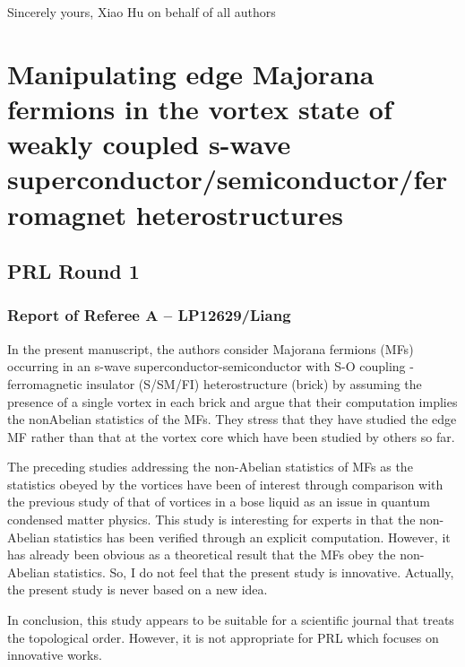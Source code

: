 \documentclass[11pt]{article}
\begin{document}
Sincerely yours, Xiao Hu on behalf of all authors

    \hypertarget{manipulating-edge-majorana-fermions-in-the-vortex-state-of-weakly-coupled-s-wave-superconductorsemiconductorferromagnet-heterostructures}{%
\section{Manipulating edge Majorana fermions in the vortex state of
weakly coupled s-wave superconductor/semiconductor/ferromagnet
heterostructures}\label{manipulating-edge-majorana-fermions-in-the-vortex-state-of-weakly-coupled-s-wave-superconductorsemiconductorferromagnet-heterostructures}}

\hypertarget{prl-round-1}{%
\subsection{PRL Round 1}\label{prl-round-1}}

\hypertarget{report-of-referee-a-lp12629liang}{%
\subsubsection{Report of Referee A --
LP12629/Liang}\label{report-of-referee-a-lp12629liang}}

In the present manuscript, the authors consider Majorana fermions (MFs)
occurring in an s-wave superconductor-semiconductor with S-O coupling
-ferromagnetic insulator (S/SM/FI) heterostructure (brick) by assuming
the presence of a single vortex in each brick and argue that their
computation implies the nonAbelian statistics of the MFs. They stress
that they have studied the edge MF rather than that at the vortex core
which have been studied by others so far.

The preceding studies addressing the non-Abelian statistics of MFs as
the statistics obeyed by the vortices have been of interest through
comparison with the previous study of that of vortices in a bose liquid
as an issue in quantum condensed matter physics. This study is
interesting for experts in that the non-Abelian statistics has been
verified through an explicit computation. However, it has already been
obvious as a theoretical result that the MFs obey the non-Abelian
statistics. So, I do not feel that the present study is innovative.
Actually, the present study is never based on a new idea.

In conclusion, this study appears to be suitable for a scientific
journal that treats the topological order. However, it is not
appropriate for PRL which focuses on innovative works.
\end{document}
